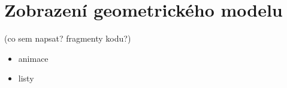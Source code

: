 \section{Zobrazení geometrického modelu}
\label{sec-3Ddisplay}
(co sem napsat? fragmenty kodu?)
\begin{itemize}
\item animace 
\item listy
\end{itemize}